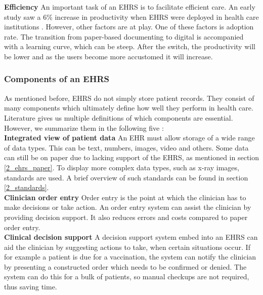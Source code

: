         \noindent\textbf{Efficiency} An important task of an EHRS is to facilitate efficient care. An early study saw a 6\% increase in productivity when EHRS were deployed in health care institutions \cite{ehrs_efficiency}. However, other factors are at play. One of these factors is adoption rate. The transition from paper-based documenting to digital is accompanied with a learning curve, which can be steep. After the switch, the productivity will be lower and as the users become more accustomed it will increase.

        

        \subsubsection{Components of an EHRS}

        As mentioned before, EHRS do not simply store patient records. They consist of many components which ultimately define how well they perform in health care. Literature gives us multiple definitions of which components are essential. However, we summarize them in the following five \cite{biomedical_informatics}:\\

        \noindent\textbf{Integrated view of patient data} An EHR must allow storage of a wide range of data types. This can be text, numbers, images, video and others. Some data can still be on paper due to lacking support of the EHRS, as mentioned in section \ref{2_ehrs_paper}. To display more complex data types, such as x-ray images, standards are used. A brief overview of such standards can be found in section \ref{2_standards}.\\

        \noindent\textbf{Clinician order entry} Order entry is the point at which the clinician has to make decisions or take action. An order entry system can assist the clinician by providing decision support. It also reduces errors and costs compared to paper order entry.\\

        \noindent\textbf{Clinical decision support} A decision support system embed into an EHRS can aid the clinician by suggesting actions to take, when certain situations occur. If for example a patient is due for a vaccination, the system can notify the clinician by presenting a constructed order which needs to be confirmed or denied. The system can do this for a bulk of patients, so manual checkups are not required, thus saving time.\\

